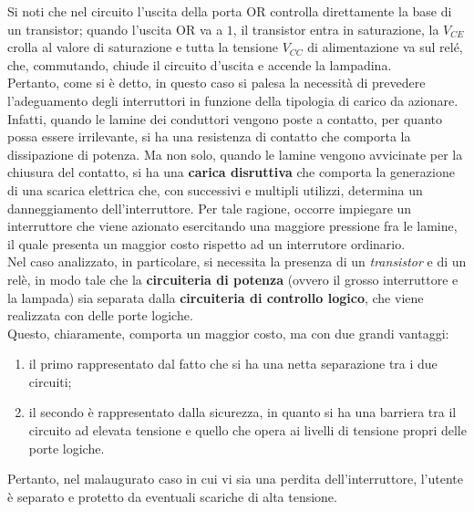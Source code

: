 \documentclass[a4paper]{extarticle}
\begin{document}
\noindent
Si noti che nel circuito l’uscita della porta OR controlla direttamente la base di un transistor; quando l’uscita OR va a $1$, il transistor entra
in saturazione, la $V_{CE}$ crolla al valore di saturazione e tutta la tensione $V_{CC}$ di alimentazione va sul relé, che, commutando, chiude il circuito d’uscita e accende la lampadina.\\
Pertanto, come si è detto, in questo caso si palesa la necessità di prevedere l'adeguamento degli interruttori in funzione della tipologia di carico da azionare.\\
Infatti, quando le lamine dei conduttori vengono poste a contatto, per quanto possa essere irrilevante, si ha una resistenza  di contatto che comporta la dissipazione di potenza. Ma non solo, quando le lamine vengono avvicinate per la chiusura del contatto, si ha una \textbf{carica disruttiva} che comporta la generazione di una scarica elettrica che, con successivi e multipli utilizzi, determina un danneggiamento dell'interruttore. Per tale ragione, occorre impiegare un interruttore che viene azionato esercitando una maggiore pressione fra le lamine, il quale presenta un maggior costo rispetto ad un interrutore ordinario.\\
Nel caso analizzato, in particolare, si necessita la presenza di un \textit{transistor} e di un relè, in modo tale che la \textbf{circuiteria di potenza} (ovvero il grosso interruttore e la lampada) sia separata dalla \textbf{circuiteria di controllo logico}, che viene realizzata con delle porte logiche.\\
Questo, chiaramente, comporta un maggior costo, ma con due grandi vantaggi:
\begin{enumerate}
  \item il primo rappresentato dal fatto che si ha una netta separazione tra i due circuiti;
  \item il secondo è rappresentato dalla sicurezza, in quanto si ha una barriera tra il circuito ad elevata tensione e quello che opera ai livelli di tensione propri delle porte logiche.
\end{enumerate}
Pertanto, nel malaugurato caso in cui vi sia una perdita dell'interruttore, l'utente è separato e protetto da eventuali scariche di alta tensione.
\end{document}
